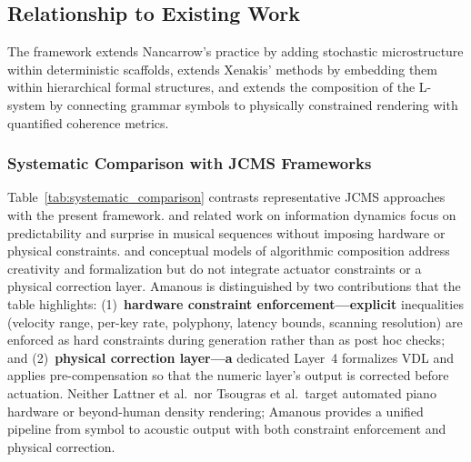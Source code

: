 \documentclass[a4paper]{article}
\theoremstyle{definition}
\theoremstyle{remark}
\begin{document}
\subsection{Relationship to Existing Work}

The framework extends Nancarrow's practice \citep{gann1995music} by adding stochastic microstructure within deterministic scaffolds, extends Xenakis' methods \citep{xenakis1992formalized} by embedding them within hierarchical formal structures, and extends the composition of the L-system \citep{manousakis2006musical} by connecting grammar symbols to physically constrained rendering with quantified coherence metrics.

\subsubsection{Systematic Comparison with JCMS Frameworks}

Table~\ref{tab:systematic_comparison} contrasts representative JCMS approaches with the present framework. \citet{lattner2018imposing} and related work on information dynamics focus on predictability and surprise in musical sequences without imposing hardware or physical constraints. \citet{kaliakatsos2016learning} and conceptual models of algorithmic composition address creativity and formalization but do not integrate actuator constraints or a physical correction layer. Amanous is distinguished by two contributions that the table highlights: (1)~\textbf{hardware constraint enforcement---explicit} inequalities (velocity range, per-key rate, polyphony, latency bounds, scanning resolution) are enforced as hard constraints during generation rather than as post hoc checks; and (2)~\textbf{physical correction layer---a} dedicated Layer~4 formalizes VDL and applies pre-compensation so that the numeric layer's output is corrected before actuation. Neither Lattner et al.\ nor Tsougras et al.\ target automated piano hardware or beyond-human density rendering; Amanous provides a unified pipeline from symbol to acoustic output with both constraint enforcement and physical correction.
\end{document}
